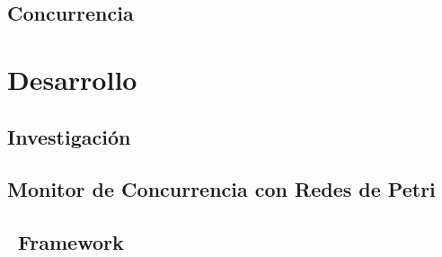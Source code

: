 \documentclass{report}
\begin{document}
        \chapter{Concurrencia}
            

    \part{Desarrollo}
        \chapter{Investigación}
            
        \chapter{Monitor de Concurrencia con Redes de Petri}
            
            
            
        \chapter{\nombreFramework \  Framework}
            

    
	
\end{document}
